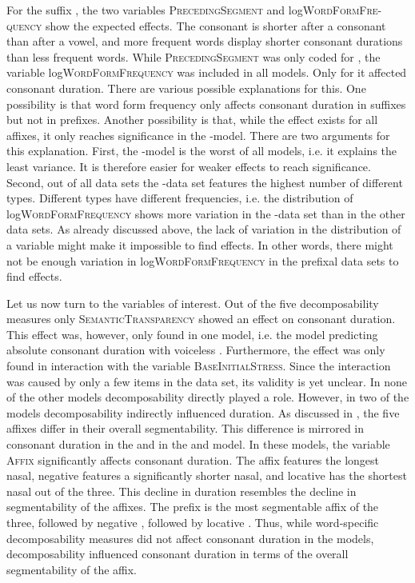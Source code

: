 For the suffix , the two variables \textsc{PrecedingSegment} and log\textsc{WordFormFre-quency} show the expected effects. The consonant is shorter after a consonant than after a vowel, and more frequent words display shorter consonant durations than less frequent words. While \textsc{PrecedingSegment} was only coded for , the variable log\textsc{WordFormFrequency} was included in all models. Only for  it affected consonant duration. There are various possible explanations for this. 
One possibility is that word form frequency only affects consonant duration in suffixes but not in prefixes. Another possibility is that, while the effect exists for all affixes, it only reaches significance in the -model. There are two arguments for this explanation.
 First, the -model is the worst of all models, i.e. it explains the least variance. It is therefore easier for weaker effects to reach significance. 
 Second, out of all data sets the -data set features the highest number of different types. Different types have different frequencies, i.e. the distribution of log\textsc{WordFormFrequency} shows more variation in the -data set than in the other data sets. As already discussed above, the lack of variation in the distribution of a variable might make it impossible to find effects. In other words, there might not be enough variation in log\textsc{WordFormFrequency} in the prefixal data sets to find effects.


Let us now turn to the variables of interest. Out of the five decomposability measures only \textsc{SemanticTransparency} showed an effect on consonant duration. This effect was, however, only found in one model, i.e. the model predicting absolute consonant duration with voiceless .  Furthermore, the effect was only found in interaction with the variable \textsc{BaseInitialStress}. Since the interaction was caused by only a few items in the data set, its validity is yet unclear. 
In none of the other models decomposability directly played a role. 
However, in two of the models decomposability indirectly influenced duration. As discussed in , the five affixes differ in their overall segmentability. This difference is mirrored in consonant duration in the  and in the  and  model. In these models, the variable \textsc{Affix} significantly affects consonant duration. The affix  features the longest nasal, negative  features a significantly shorter nasal, and locative  has the shortest nasal out of the three. This decline in duration resembles the decline in segmentability of the affixes. The prefix  is the most segmentable affix of the three, followed by negative , followed by locative . Thus, while word-specific decomposability measures did not affect consonant duration in the models, decomposability influenced consonant duration in terms of the overall segmentability of the affix.


